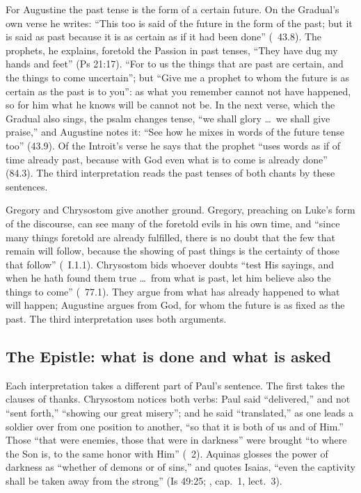For Augustine the past tense is the form of a certain future. On the
Gradual's own verse he writes: ``This too is said of the future in the form
of the past; but it is said as past because it is as certain as if it had
been done'' (~43.8). The prophets, he explains,
foretold the Passion in past tenses, ``They have dug my hands and feet'' (Ps
21:17). ``For to us the things that are past are certain, and the things to
come uncertain''; but ``Give me a prophet to whom the future is as certain as
the past is to you'': as what you remember cannot not have happened, so for
him what he knows will be cannot not be. In the next verse, which the Gradual
also sings, the psalm changes tense, ``we shall glory \dots\ we shall give
praise,'' and Augustine notes it: ``See how he mixes in words of the future
tense too'' (43.9). Of the Introit's verse he says that the prophet ``uses
words as if of time already past, because with God even what is to come is
already done'' (84.3). The third interpretation reads the past tenses of both
chants by these sentences.

Gregory and Chrysostom give another ground. Gregory, preaching on Luke's form
of the discourse, can see many of the foretold evils in his own time, and
``since many things foretold are already fulfilled, there is no doubt that the
few that remain will follow, because the showing of past things is the
certainty of those that follow'' (~I.1.1).
Chrysostom bids whoever doubts ``test His sayings, and when he hath found
them true \dots\ from what is past, let him believe also the things to come''
(~77.1). They argue from what has already happened to what
will happen; Augustine argues from God, for whom the future is as fixed as the
past. The third interpretation uses both arguments.

\subsection{The Epistle: what is done and what is asked}

Each interpretation takes a different part of Paul's sentence. The first
takes the clauses of thanks. Chrysostom notices both verbs: Paul said
``delivered,'' and not ``sent forth,'' ``showing our great misery''; and he
said ``translated,'' as one leads a soldier over from one position to
another, ``so that it is both of us and of Him.'' Those ``that were enemies,
those that were in darkness'' were brought ``to where the Son is, to the same
honor with Him'' (~2). Aquinas glosses the power of
darkness as ``whether of demons or of sins,'' and quotes Isaias, ``even the
captivity shall be taken away from the strong'' (Is 49:25; , cap.~1, lect.~3).

